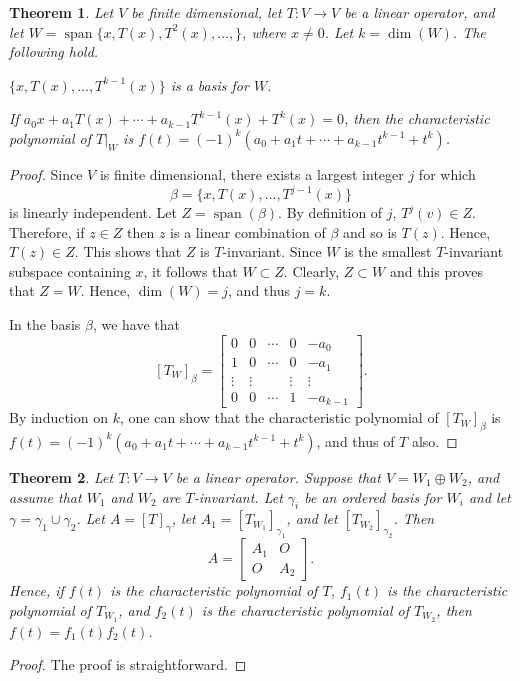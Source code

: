 \documentclass[12pt]{article}
\DeclareMathOperator{\spn}{span}
\newtheorem{theorem}{Theorem}[section]
\theoremstyle{definition}
\begin{document}
\begin{theorem}
Let $V$ be finite dimensional, let $T:V\rightarrow V$ be a linear operator, and let $W=\spn\{x,T(x),T^2(x),\ldots,\}$, where $x\neq 0$.  Let $k=\dim(W)$.  The following hold.
\begin{compactenum}[(a)]
\item $\{x,T(x),\ldots,T^{k-1}(x)\}$ is a basis for $W$.
\item If $a_0x+a_1T(x) + \cdots + a_{k-1} T^{k-1}(x) + T^k(x) = 0$, then the characteristic polynomial of $T|_W$ is $f(t) = (-1)^k(a_0+a_1t+\cdots+a_{k-1}t^{k-1} + t^k)$.
\end{compactenum}
\end{theorem}
\begin{proof}
Since $V$ is finite dimensional, there exists a largest integer $j$ for which $$\beta=\{x,T(x),\ldots,T^{j-1}(x)\}$$ is linearly independent.  Let $Z=\spn(\beta)$.  By definition of $j$, $T^j(v)\in Z$.  Therefore, if $z\in Z$ then $z$ is a linear combination of $\beta$ and so is $T(z)$.  Hence, $T(z)\in Z$.  This shows that $Z$ is $T$-invariant.  Since $W$ is the smallest $T$-invariant subspace containing $x$, it follows that $W\subset Z$.  Clearly, $Z\subset W$ and this proves that $Z=W$.  Hence, $\dim(W)=j$, and thus $j=k$.

In the basis $\beta$, we have that
\[
[T_W]_\beta = \begin{bmatrix}0 & 0 & \cdots & 0 & -a_0\\1 & 0 & \cdots & 0 & -a_1\\\vdots & \vdots & & \vdots & \vdots\\
0 & 0 & \cdots & 1 & -a_{k-1}\end{bmatrix}.
\]
By induction on $k$, one can show that the characteristic polynomial of $[T_W]_\beta$ is $f(t) = (-1)^k(a_0+a_1t+\cdots+a_{k-1}t^{k-1} + t^k)$, and thus of $T$ also.
\end{proof}


\begin{theorem}
Let $T:V\rightarrow V$ be a linear operator.  Suppose that $V=W_1\oplus W_2$, and assume that $W_1$ and $W_2$ are $T$-invariant.  Let $\gamma_i$ be an ordered basis for $W_i$ and let $\gamma=\gamma_1\cup\gamma_2$.  Let $A=[T]_\gamma$, let $A_1=[T_{W_1}]_{\gamma_1}$, and let $[T_{W_2}]_{\gamma_2}$.  Then
\[
A = \begin{bmatrix} A_1 & O\\O & A_2\end{bmatrix}.
\]
Hence, if $f(t)$ is the characteristic polynomial of $T$, $f_1(t)$ is the characteristic polynomial of $T_{W_1}$, and $f_2(t)$ is the characteristic polynomial of $T_{W_2}$, then $f(t) = f_1(t) f_2(t)$.
\end{theorem}
\begin{proof}
The proof is straightforward.
\end{proof}
\end{document}
